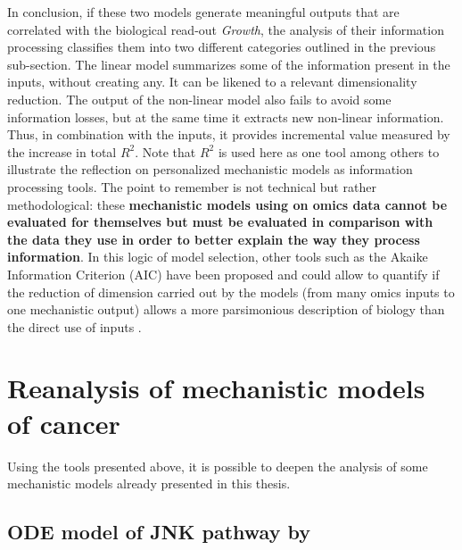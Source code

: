 \documentclass[a4paper,12pt,twoside,onecolumn,openright,final,oldfontcommands]{memoir}
\begin{document}
In conclusion, if these two models generate meaningful outputs that are
correlated with the biological read-out \emph{Growth}, the analysis of
their information processing classifies them into two different
categories outlined in the previous sub-section. The linear model
summarizes some of the information present in the inputs, without
creating any. It can be likened to a relevant dimensionality reduction.
The output of the non-linear model also fails to avoid some information
losses, but at the same time it extracts new non-linear information.
Thus, in combination with the inputs, it provides incremental value
measured by the increase in total \(R^2\). Note that \(R^2\) is used
here as one tool among others to illustrate the reflection on
personalized mechanistic models as information processing tools. The
point to remember is not technical but rather methodological: these
\textbf{mechanistic models using on omics data cannot be evaluated for
themselves but must be evaluated in comparison with the data they use in
order to better explain the way they process information}. In this logic
of model selection, other tools such as the Akaike Information Criterion
(AIC) have been proposed and could allow to quantify if the reduction of
dimension carried out by the models (from many omics inputs to one
mechanistic output) allows a more parsimonious description of biology
than the direct use of inputs \citep{kirk2013model}.

\section{Reanalysis of mechanistic models of
cancer}\label{reanalysis-of-mechanistic-models-of-cancer}

Using the tools presented above, it is possible to deepen the analysis
of some mechanistic models already presented in this thesis.

\subsection{\texorpdfstring{ODE model of JNK pathway by
\citet{fey2015signaling}}{ODE model of JNK pathway by @fey2015signaling}}\label{ode-model-of-jnk-pathway-by-fey2015signaling}
\end{document}
